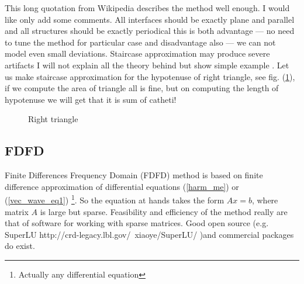 \documentclass[12pt]{article}
\begin{document}
This long quotation from Wikipedia  describes the method well enough. I would like only add some comments. All interfaces should be exactly plane and parallel and all structures should be exactly periodical this is both advantage --- no need to tune the method for particular case and disadvantage also --- we can not model even small deviations. Staircase approximation may produce severe artifacts I will not explain all the theory behind but show simple example . Let us make staircase approximation for the hypotenuse of right triangle, see fig. (\ref{fig:rtrg}), if we compute the area of triangle all is fine, but on computing the length of hypotenuse we will get that it is sum of catheti!
\begin{figure}[h]
    \centering
    \caption{Right triangle}
    \label{fig:rtrg}
\end{figure}
\subsection{FDFD}
Finite Differences Frequency Domain (FDFD) method is based on finite difference approximation of differential equations (\ref{harm_me}) or (\ref{vec_wave_eq1}) \footnote{Actually any differential equation}. So the equation at hands takes the form $A x=b$, where matrix $A$ is large but sparse. Feasibility and efficiency of the method really are that of software for working with sparse matrices. Good open source (e.g. SuperLU http://crd-legacy.lbl.gov/~xiaoye/SuperLU/ )and commercial packages do exist. 
\end{document}
